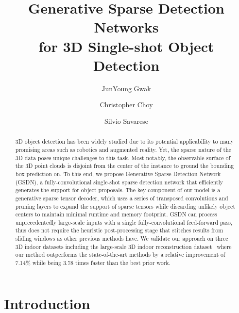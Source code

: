 \documentclass[runningheads]{llncs}
\begin{document}
\pagestyle{headings}


\title{Generative Sparse Detection Networks \\ for 3D Single-shot Object Detection}




\author{JunYoung Gwak \and
Christopher Choy \and
Silvio Savarese}
\maketitle







\begin{abstract}
3D object detection has been widely studied due to its potential applicability to many promising areas such as robotics and augmented reality. Yet, the sparse nature of the 3D data poses unique challenges to this task. Most notably, the observable surface of the 3D point clouds is disjoint from the center of the instance to ground the bounding box prediction on. To this end, we propose Generative Sparse Detection Network (GSDN), a fully-convolutional single-shot sparse detection network that efficiently generates the support for object proposals. The key component of our model is a generative sparse tensor decoder, which uses a series of transposed convolutions and pruning layers to expand the support of sparse tensors while discarding unlikely object centers to maintain minimal runtime and memory footprint. GSDN can process unprecedentedly large-scale inputs with a single fully-convolutional feed-forward pass, thus does not require the heuristic post-processing stage that stitches results from sliding windows as other previous methods have. We validate our approach on three 3D indoor datasets including the large-scale 3D indoor reconstruction dataset~\cite{dai2017scannet} where our method outperforms the state-of-the-art methods by a relative improvement of 7.14\% while being 3.78 times faster than the best prior work.
\end{abstract}

\section{Introduction}
\end{document}
